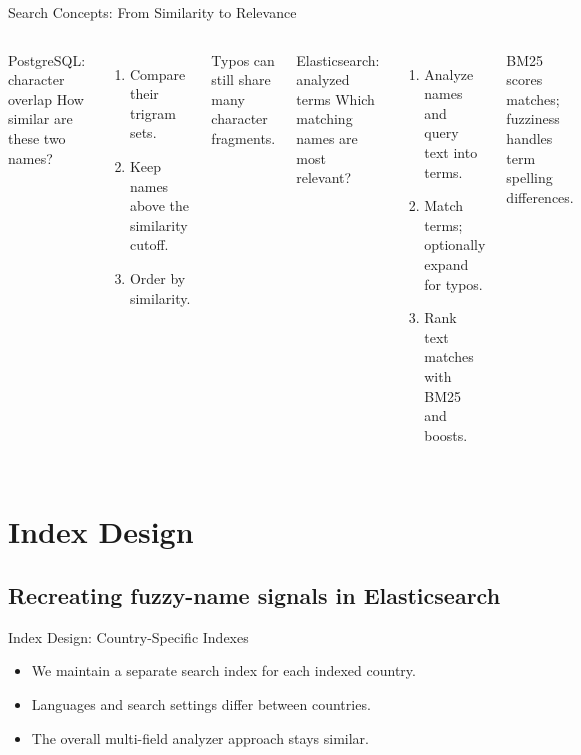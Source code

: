 \documentclass[aspectratio=169]{beamer}
\begin{document}
\begin{frame}{Search Concepts: From Similarity to Relevance}
  \small
  \begin{columns}[T,totalwidth=\textwidth]
      \begin{block}{PostgreSQL: character overlap}
        How similar are these two names?
      \end{block}
      \begin{enumerate}
        \item Compare their trigram sets.
        \item Keep names above the similarity cutoff.
        \item Order by similarity.
      \end{enumerate}
      {\small\textcolor{MutedText}{Typos can still share many character fragments.}}
      \begin{block}{Elasticsearch: analyzed terms}
        Which matching names are most relevant?
      \end{block}
      \begin{enumerate}
        \item Analyze names and query text into terms.
        \item Match terms; optionally expand for typos.
        \item Rank text matches with BM25 and boosts.
      \end{enumerate}
      {\small\textcolor{MutedText}{BM25 scores matches; fuzziness handles term spelling differences.}}
  \end{columns}
  \vspace{0.2cm}
\end{frame}

\section{Index Design}
\subsection{Recreating fuzzy-name signals in Elasticsearch}

\begin{frame}{Index Design: Country-Specific Indexes}
  \hypertarget{sec:index-design}{}
  \begin{itemize}
    \item We maintain a separate search index for each indexed country.
    \item Languages and search settings differ between countries.
    \item The overall multi-field analyzer approach stays similar.
  \end{itemize}
\end{frame}
\end{document}
